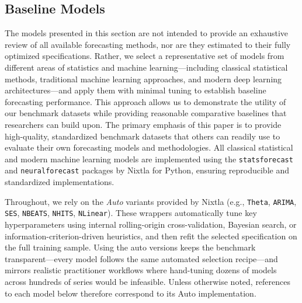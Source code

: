 \documentclass{article}
\begin{document}
\subsection{Baseline Models}

The models presented in this section are not intended to provide an exhaustive review of all available forecasting methods, nor are they estimated to their fully optimized specifications. Rather, we select a representative set of models from different areas of statistics and machine learning---including classical statistical methods, traditional machine learning approaches, and modern deep learning architectures---and apply them with minimal tuning to establish baseline forecasting performance. This approach allows us to demonstrate the utility of our benchmark datasets while providing reasonable comparative baselines that researchers can build upon. The primary emphasis of this paper is to provide high-quality, standardized benchmark datasets that others can readily use to evaluate their own forecasting models and methodologies. All classical statistical and modern machine learning models are implemented using the \texttt{statsforecast} and \texttt{neuralforecast} packages by Nixtla for Python, ensuring reproducible and standardized implementations.

Throughout, we rely on the \emph{Auto} variants provided by Nixtla (e.g., \texttt{Theta}, \texttt{ARIMA}, \texttt{SES}, \texttt{NBEATS}, \texttt{NHITS}, \texttt{NLinear}). These wrappers automatically tune key hyperparameters using internal rolling-origin cross-validation, Bayesian search, or information-criterion-driven heuristics, and then refit the selected specification on the full training sample. Using the auto versions keeps the benchmark transparent—every model follows the same automated selection recipe—and mirrors realistic practitioner workflows where hand-tuning dozens of models across hundreds of series would be infeasible. Unless otherwise noted, references to each model below therefore correspond to its Auto implementation.
\end{document}
